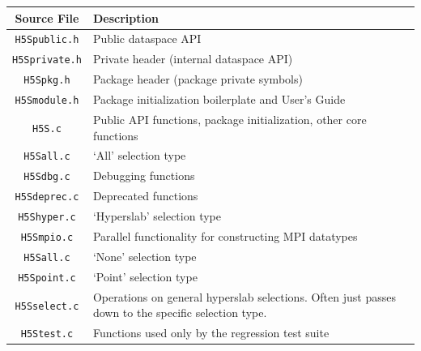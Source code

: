 \begin{table}[!ht]
\begin{tabular}{||c|l||}
\hline
\textbf{Source File} & \textbf{Description} \\  [0.5ex] 
\hline\hline
\texttt{H5Spublic.h} & Public dataspace API \\
\texttt{H5Sprivate.h} & Private header (internal dataspace API) \\
\texttt{H5Spkg.h} & Package header (package private symbols) \\
\texttt{H5Smodule.h} & Package initialization boilerplate and User's Guide \\
\texttt{H5S.c} & Public API functions, package initialization, other core functions \\
\texttt{H5Sall.c} & `All' selection type \\
\texttt{H5Sdbg.c} & Debugging functions \\
\texttt{H5Sdeprec.c} & Deprecated functions \\
\texttt{H5Shyper.c} & `Hyperslab' selection type \\
\texttt{H5Smpio.c} & Parallel functionality for constructing MPI datatypes \\
\texttt{H5Sall.c} & `None' selection type \\
\texttt{H5Spoint.c} & `Point' selection type \\
\texttt{H5Sselect.c} & Operations on general hyperslab selections. Often just passes down to the specific selection type. \\  
\texttt{H5Stest.c} & Functions used only by the regression test suite \\
\hline
\end{tabular}
\label{table:H5Scode}
\end{table}



